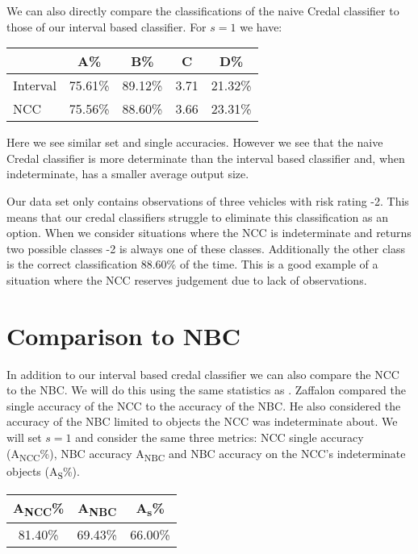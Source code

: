 We can also directly compare the classifications of the naive Credal classifier to those of our interval based classifier. For $s=1$ we have:
\begin{center}
\begin{tabular}{l|c c c c}
         & A\%     & B\%     & C    & D\%     \\
\hline
Interval & 75.61\% & 89.12\% & 3.71 & 21.32\% \\
NCC      & 75.56\% & 88.60\% & 3.66 & 23.31\% \\
\end{tabular}
\end{center}
Here we see similar set and single accuracies.
However we see that the naive Credal classifier is more determinate than the interval based classifier and, when indeterminate, has a smaller average output size.

Our data set only contains observations of three vehicles with risk rating -2.
This means that our credal classifiers struggle to eliminate this classification as an option.
When we consider situations where the NCC is indeterminate and returns two possible classes -2 is always one of these classes.
Additionally the other class is the correct classification 88.60\% of the time.
This is a good example of a situation where the NCC reserves judgement due to lack of observations.

\section{Comparison to NBC}

In addition to our interval based credal classifier we can also compare the NCC to the NBC.
We will do this using the same statistics as \cite{Zaffalon01}.
Zaffalon compared the single accuracy of the NCC to the accuracy of the NBC.
He also considered the accuracy of the NBC limited to objects the NCC was indeterminate about.
We will set $s=1$ and consider the same three metrics: NCC single accuracy (A\textsubscript{NCC}\%), NBC accuracy A\textsubscript{NBC} and NBC accuracy on  the NCC's indeterminate objects (A\textsubscript{S}\%).
\begin{center}
\begin{tabular}{c c c}
\hline
A\textsubscript{NCC}\% & A\textsubscript{NBC} & A\textsubscript{s}\% \\
\hline
81.40\%                & 69.43\%              & 66.00\% \\
\hline
\end{tabular}
\end{center}

